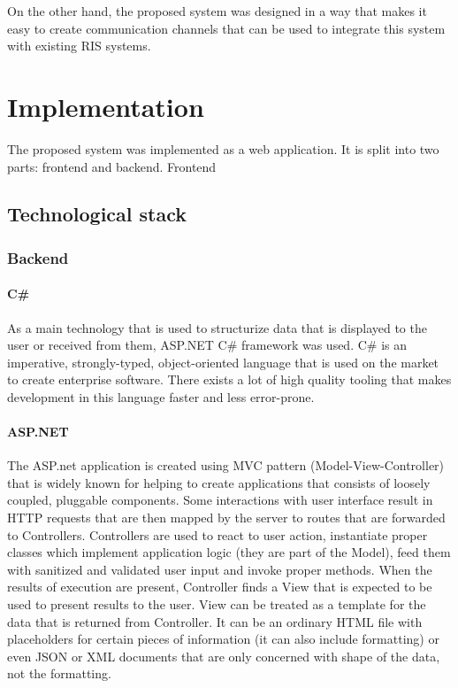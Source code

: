 \documentclass[12pt, twoside, openany]{report}
\theoremstyle{definition}
\begin{document}
On the other hand, the proposed system was designed in a way that makes it easy to create communication channels that can be used to integrate this system with existing RIS systems. 









\chapter{Implementation}
The proposed system was implemented as a web application. It is split into two parts: frontend and backend. Frontend  
\section{Technological stack}

\subsection{Backend}
\subsubsection{C\#}
As a main technology that is used to structurize data that is displayed to the user or received from them, ASP.NET C\# framework was used.
C\# is an imperative, strongly-typed, object-oriented language that is used on the market to create enterprise software. There exists a lot of high quality tooling that makes development in this language faster and less error-prone.

\subsubsection{ASP.NET}
The ASP.net application is created using MVC pattern (Model-View-Controller) that is widely known for helping to create applications that consists of loosely coupled, pluggable components. Some interactions with user interface result in HTTP requests that are then mapped by the server to routes that are forwarded to Controllers. Controllers are used to react to user action, instantiate proper classes which implement application logic (they are part of the Model), feed them with sanitized and validated user input and invoke proper methods. When the results of execution are present, Controller finds a View that is expected to be used to present results to the user. View can be treated as a template for the data that is returned from Controller. It can be an ordinary HTML file with placeholders for certain pieces of information (it can also include formatting) or even JSON or XML documents that are only concerned with shape of the data, not the formatting.
\end{document}
